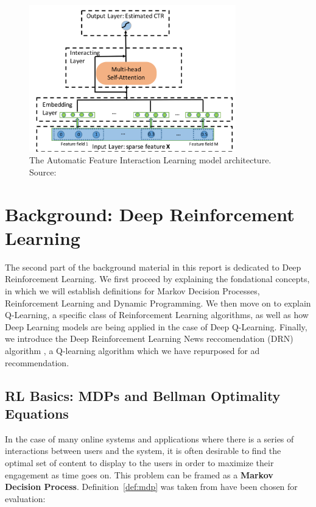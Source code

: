 \documentclass{mldsmsc}
\begin{document}
\begin{figure}[h]
    \centering
    \includegraphics[width=0.8\textwidth]{../figures/autoint.png}
    \caption{The Automatic Feature Interaction Learning model architecture. Source: \citep{RefWorks:song2019autoint}}
    \label{fig:autoint}
\end{figure}


\chapter{Background: Deep Reinforcement Learning}
\label{chap:background-drl}

The second part of the background material in this report is dedicated to Deep Reinforcement Learning. We first
proceed by explaining the fondational concepts, in which we will establish definitions for
Markov Decision Processes, Reinforcement Learning and Dynamic Programming. We then move on to explain
Q-Learning, a specific class of Reinforcement Learning algorithms, as well as how Deep Learning
models are being applied in the case of Deep Q-Learning. Finally, we introduce the Deep Reinforcement
Learning News reccomendation (DRN) algorithm \citep{RefWorks:zheng2018drn:}, a Q-learning algorithm
which we have repurposed for ad recommendation.

\section{RL Basics: MDPs and Bellman Optimality Equations}

In the case of many online systems and applications where there is a series of interactions between
users and the system, it is often desirable to find the optimal set of content to display to the
users in order to maximize their engagement as time goes on. This problem can be framed as a
\textbf{Markov Decision Process}. Definition~\ref{def:mdp} was taken from \citep{pike-burke2024LearnigAgents}
have been chosen for evaluation:
\end{document}
